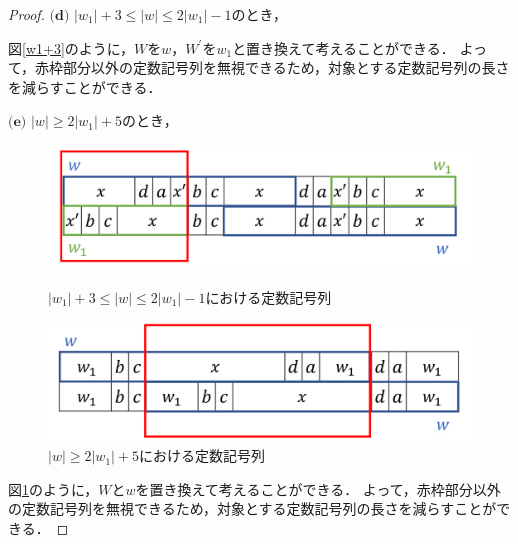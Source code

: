 \begin{proof}
  \noindent$\textbf{(d)}$ $|w_{1}|+3 \le |w| \le 2|w_{1}|-1$のとき，
  
  
  図\ref{w1+3}のように，$W$を$w$，$W^{\prime}$を$w_{1}$と置き換えて考えることができる．
  よって，赤枠部分以外の定数記号列を無視できるため，対象とする定数記号列の長さを減らすことができる．
  
  \noindent$\textbf{(e)}$ $|w| \ge 2|w_{1}|+5$のとき，
  
  \begin{figure}
  \centering
  \includegraphics[width=\linewidth]{figs/w1+3.png}
  \vspace{-1cm}
  \caption{$|w_{1}|+3 \le |w| \le 2|w_{1}|-1$における定数記号列}
  \label{w1+3}
  
  \centering
  \includegraphics[width=\linewidth]{figs/2w1+5.png}
  \vspace{-1cm}
  \caption{$|w| \ge 2|w_{1}|+5$における定数記号列}
  \label{2w1+5}
  \vspace*{-.3cm}
  \end{figure}
  
  図\ref{2w1+5}のように，$W$と$w$を置き換えて考えることができる．
  よって，赤枠部分以外の定数記号列を無視できるため，対象とする定数記号列の長さを減らすことができる．
  

\end{proof}

